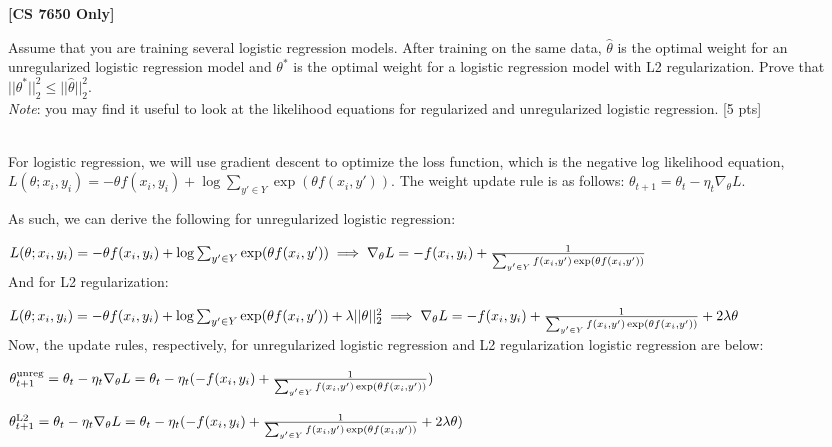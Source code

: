\textbf{[CS 7650 Only]} 

Assume that you are training several logistic regression models.
After training on the same data, $\hat{\theta}$ is the optimal weight for an unregularized logistic regression model and $\theta^{*}$ is the optimal weight for a logistic regression model with L2 regularization.
Prove that $||\theta^{*}||^{2}_{2} \leq ||\hat{\theta}||^{2}_{2}$. \\
\emph{Note}: you may find it useful to look at the likelihood equations for regularized and unregularized logistic regression.
[5 pts]

\begin{solution} \ \\
	For logistic regression, we will use gradient descent to optimize the loss function, which is the negative log likelihood equation, $L(\theta; x_i, y_i) = -\theta f(x_i, y_i) + \log\sum_{y' \in Y} \exp(\theta f(x_i, y'))$. The weight update rule is as follows: $\theta_{t+1} = \theta_{t} - \eta_t\nabla_\theta L$.
	
	As such, we can derive the following for unregularized logistic regression:
	
	$L(\theta; x_i, y_i) = -\theta f(x_i, y_i) + \log\sum_{y' \in Y} \exp(\theta f(x_i, y')) \\
	\implies \nabla_\theta L = -f(x_i, y_i) + \frac{1}{\sum_{y' \in Y} f(x_i, y')\exp(\theta f(x_i, y'))}$\\
	
	And for L2 regularization:
	
	$L(\theta; x_i, y_i) = -\theta f(x_i, y_i) + \log\sum_{y' \in Y} \exp(\theta f(x_i, y')) + \lambda\lvert\lvert\theta\rvert\rvert_2^2 \\
	\implies \nabla_\theta L = -f(x_i, y_i) + \frac{1}{\sum_{y' \in Y} f(x_i, y')\exp(\theta f(x_i, y'))} + 2\lambda\theta$\\
	
	Now, the update rules, respectively, for unregularized logistic regression and L2 regularization logistic regression are below:
	
	$\theta_{t+1}^{\text{unreg}} = \theta_{t} - \eta_t\nabla_\theta L\\
	= \theta_t - \eta_t (-f(x_i, y_i) + \frac{1}{\sum_{y' \in Y} f(x_i, y')\exp(\theta f(x_i, y'))})$
	
	$\theta_{t+1}^{\text{L2}} = \theta_{t} - \eta_t\nabla_\theta L\\
	= \theta_t - \eta_t (-f(x_i, y_i) + \frac{1}{\sum_{y' \in Y} f(x_i, y')\exp(\theta f(x_i, y'))} + 2\lambda\theta)$\\
	

\end{solution}
